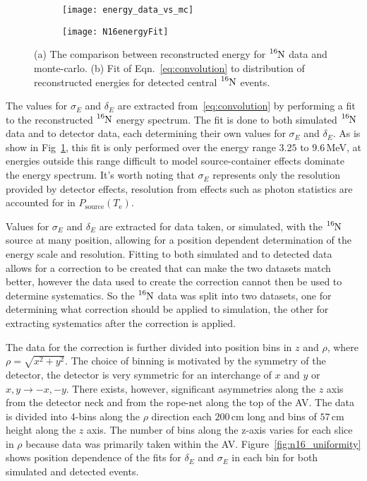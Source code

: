 \begin{figure}[htbp]
\centering
\begin{subfigure}{0.48\textwidth}
\centering
\texttt{[image: energy\_data\_vs\_mc]}
\caption[]{}
\end{subfigure}
\hfill
\begin{subfigure}{0.48\textwidth}
\centering
\texttt{[image: N16energyFit]}
\caption[]{}
\end{subfigure}
\caption[$\ce{^{16}N}$ Energy Comparisons]{ (a) The comparison between
reconstructed energy for $\ce{^{16}N}$ data and monte-carlo.  (b) Fit of
Eqn.~\eqref{eq:convolution} to distribution of reconstructed energies for
detected central $\ce{^{16}N}$ events.}
\label{fig:n16_energy}
\end{figure}
The values for $\sigma_{E}$ and $\delta_{E}$ are extracted from~\eqref{eq:convolution}
by performing a fit to the reconstructed $\ce{^{16}N}$ energy spectrum.
The fit is done to both simulated $\ce{^{16}N}$ data and to detector data,
each determining their own values for $\sigma_{E}$ and $\delta_{E}$.
As is show in Fig~\ref{fig:n16_energy}, this fit is only performed
over the energy range $3.25$ to $9.6$\,MeV, at energies outside this range
difficult to model source-container effects dominate the energy spectrum.
It's worth noting that $\sigma_{E}$ represents only the resolution provided by detector
effects, resolution from effects such as photon statistics are accounted
for in $P_\mathrm{source}(T_{\mathrm{e}})$.

Values for $\sigma_{E}$ and $\delta_{E}$ are extracted for data taken, or simulated, with
the $\ce{^{16}N}$ source at many position, allowing for a position dependent
determination of the energy scale and resolution.
Fitting to both simulated and to detected data allows for a correction to
be created that can make the two datasets match better, however the data
used to create the correction cannot then be used to determine systematics.
So the $\ce{^{16}N}$ data was split into two datasets, one for determining
what correction should be applied to simulation, the other for extracting systematics
after the correction is applied.

The data for the correction is further divided into position bins in $z$ and
$\rho$, where $\rho = \sqrt{x^{2} + y^{2}}$. The choice of binning is motivated
by the symmetry of the detector, the detector is very symmetric for an interchange
of $x$ and $y$ or $x,y \rightarrow -x,-y$.
There exists, however, significant asymmetries along the $z$ axis
from the detector neck and from the rope-net along the top of the AV\@.
The data is divided into 4-bins along the $\rho$ direction each $200$\,cm long
and bins of $57$\,cm height along the $z$ axis. The number of bins along the
z-axis varies for each slice in $\rho$ because data was primarily taken within
the AV.\@
Figure~\ref{fig:n16_uniformity} shows position dependence of the fits for
$\delta_{E}$ and $\sigma_{E}$ in each bin for both simulated and detected
events.

